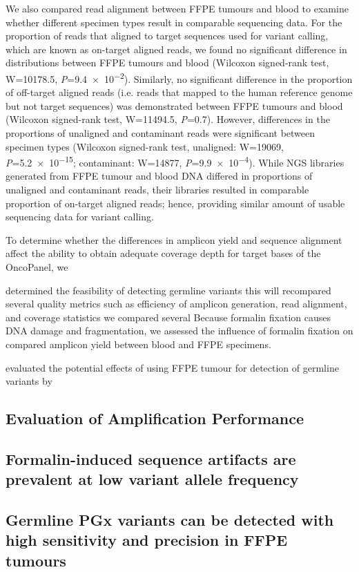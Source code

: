 \documentclass{bmcart}
\begin{document}
We also compared read alignment between FFPE tumours and blood to examine whether different specimen types result in comparable sequencing data. For the proportion of reads that aligned to target sequences used for variant calling, which are known as on-target aligned reads, we found no significant difference in distributions between FFPE tumours and blood (Wilcoxon signed-rank test, W=\num{10178.5}, \textit{P}=\num{9.4e-2}). Similarly, no significant difference in the proportion of off-target aligned reads (i.e. reads that mapped to the human reference genome but not target sequences) was demonstrated between FFPE tumours and blood (Wilcoxon signed-rank test, W=\num{11494.5}, \textit{P}=\num{0.7}). However, differences in the proportions of unaligned and contaminant reads were significant between specimen types (Wilcoxon signed-rank test, unaligned: W=\num{19069}, \textit{P}=\num{5.2e-15}; contaminant: W=\num{14877}, \textit{P}=\num{9.9e-4}). While NGS libraries generated from FFPE tumour and blood DNA differed in proportions of unaligned and contaminant reads, their libraries resulted in comparable proportion of on-target aligned reads; hence, providing similar amount of usable sequencing data for variant calling.

To determine whether the differences in amplicon yield and sequence alignment affect the ability to obtain adequate coverage depth for target bases of the OncoPanel, we

determined the feasibility of detecting germline variants this will recompared several quality metrics such as efficiency of amplicon generation, read alignment, and coverage statistics we compared several Because formalin fixation causes DNA damage and fragmentation, we assessed the influence of formalin fixation on compared amplicon yield between blood and FFPE specimens.

evaluated the potential effects of using FFPE tumour for detection of germline variants by

\subsection*{Evaluation of Amplification Performance}

\subsection*{Formalin-induced sequence artifacts are prevalent at low variant allele frequency}

\subsection*{Germline PGx variants can be detected with high sensitivity and precision in FFPE tumours}
\end{document}
